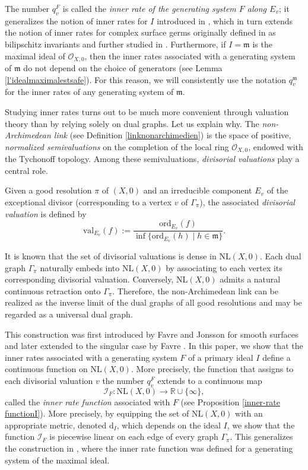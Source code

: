 \documentclass[reqno,dvipsnames,12pt]{amsart}
\begin{document}
The number $q_v^{F}$ is called the \textit{inner rate of the generating system $F$ along $E_v$}; it generalizes the notion of inner rates for $I$ introduced in \cite{yenni2}, which in turn extends the notion of inner rates for complex surface germs originally defined in \cite{BNP} as bilipschitz invariants and further studied in \cite{BFP,yenni1}. Furthermore, if $I=\mathfrak{m}$ is the maximal ideal of $\mathcal{O}_{X,0}$, then the inner rates associated with a generating system of $\mathfrak{m}$ do not depend on the choice of generators (see Lemma \ref{l'idealmaximalestsafe}). For this reason, we will consistently use the notation $q_v^{\mathfrak{m}}$ for the inner rates of any generating system of $\mathfrak{m}$.


Studying inner rates turns out to be much more convenient through valuation theory than by relying solely on dual graphs. Let us explain why. The \textit{non-Archimedean link} (see Definition \ref{linknonarchimedien}) is the space of positive, \textit{normalized semivaluations} on the completion of the local ring $\mathcal{O}_{X,0}$, endowed with the Tychonoff topology. Among these semivaluations, \textit{divisorial valuations} play a central role.

Given a good resolution $\pi$ of $(X,0)$ and an irreducible component $E_v$ of the exceptional divisor (corresponding to a vertex $v$ of $\Gamma_\pi$), the associated \textit{divisorial valuation} is defined by
\[
\mathrm{val}_{E_v}(f) := \frac{\mathrm{ord}_{E_v}(f)}{\inf \{ \mathrm{ord}_{E_v}(h) \mid h \in \mathfrak{m} \}}.
\]

It is known that the set of divisorial valuations is dense in $\mathrm{NL}(X,0)$. Each dual graph $\Gamma_\pi$ naturally embeds into $\mathrm{NL}(X,0)$ by associating to each vertex its corresponding divisorial valuation. Conversely, $\mathrm{NL}(X,0)$ admits a natural continuous retraction onto $\Gamma_\pi$. Therefore, the non-Archimedean link can be realized as the inverse limit of the dual graphs of all good resolutions and may be regarded as a universal dual graph.

This construction was first introduced by Favre and Jonsson \cite{FavreJonsson2004} for smooth surfaces and later extended to the singular case by Favre \cite{Favre2010}. In this paper, we show that the inner rates associated with a generating system $F$ of a primary ideal $I$ define a continuous function on $\mathrm{NL}(X,0)$. More precisely, the function that assigns to each divisorial valuation $v$ the number $q_v^{F}$ extends to a continuous map
\[
\mathcal{I}_F : \mathrm{NL}(X,0) \longrightarrow \mathbb{R} \cup \{\infty\},
\]
called the \textit{inner rate function} associated with $F$ (see Proposition \ref{inner-rate functionI}). More precisely, by equipping the set of  $\mathrm{NL}(X,0)$ with an appropriate metric, denoted $\mathrm{d}_I$, which depends on the ideal $I$, we show that the function $\mathcal{I}_F$ is piecewise linear on each edge of every graph $\Gamma_{\pi}$. This generalizes the construction in \cite{BFP}, where the inner rate function was defined for a generating system of the maximal ideal.
\end{document}
